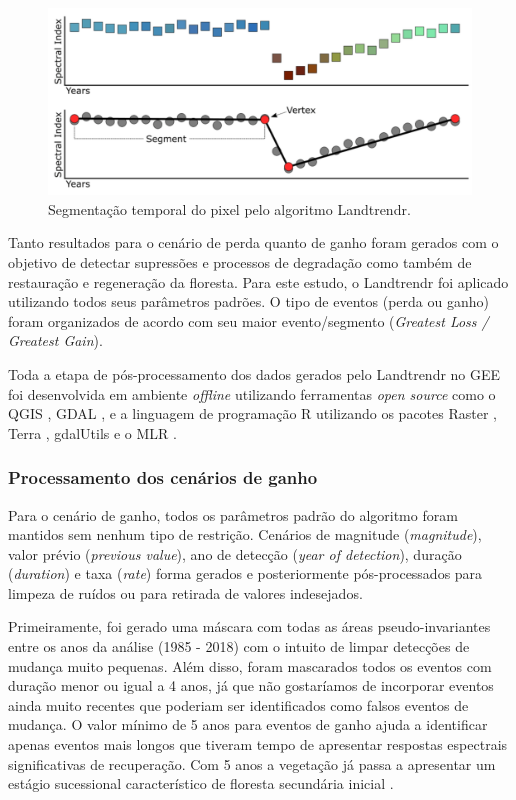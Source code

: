 \begin{figure}[h!]
    \centering
    \includegraphics[scale=.8]{images/landtrendr_graphic.png}
    \caption{Segmentação temporal do pixel pelo algoritmo Landtrendr.}
    \label{fig:landtrendr_graph}
\end{figure}

Tanto resultados para o cenário de perda quanto de ganho foram gerados com o objetivo de detectar supressões e processos de degradação como também de restauração e regeneração da floresta. Para este estudo, o Landtrendr foi aplicado utilizando todos seus parâmetros padrões. O tipo de eventos (perda ou ganho) foram organizados de acordo com seu maior evento/segmento (\textit{Greatest Loss / Greatest Gain}).

Toda a etapa de pós-processamento dos dados gerados pelo Landtrendr no GEE foi desenvolvida em ambiente \textit{offline} utilizando ferramentas \textit{open source} como o QGIS \citep{QGIS_software}, GDAL \citep{gdal}, e a linguagem de programação R \citep{Rsoftware} utilizando os pacotes Raster \citep{raster}, Terra \cite{terra}, gdalUtils \citep{gdalutils} e o MLR \citep{mlr}.

\subsubsection{Processamento dos cenários de ganho}
\hspace{13pt} Para o cenário de ganho, todos os parâmetros padrão do algoritmo foram mantidos sem nenhum tipo de restrição. Cenários de magnitude (\textit{magnitude}), valor prévio (\textit{previous value}), ano de detecção (\textit{year of detection}), duração (\textit{duration}) e taxa (\textit{rate}) forma gerados e posteriormente pós-processados para limpeza de ruídos ou para retirada de valores indesejados. 

Primeiramente, foi gerado uma máscara com todas as áreas pseudo-invariantes entre os anos da análise (1985 - 2018) com o intuito de limpar detecções de mudança muito pequenas. Além disso, foram mascarados todos os eventos com duração menor ou igual a 4 anos, já que não gostaríamos de incorporar eventos ainda muito recentes que poderiam ser identificados como falsos eventos de mudança. O valor mínimo de 5 anos para eventos de ganho ajuda a identificar apenas eventos mais longos que tiveram tempo de apresentar respostas espectrais significativas de recuperação. Com 5 anos a vegetação já passa a apresentar um estágio sucessional característico de floresta secundária inicial \citep{Chazdon2014}. 


